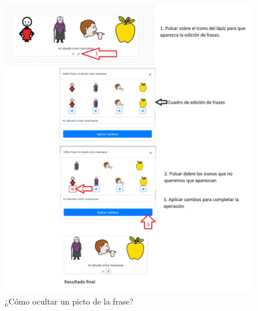 \begin{figure}[h!]
	\centering
	\includegraphics[width=\linewidth]{Imagenes/Bitmap/Tarea3-Pista4}
	\caption{¿Cómo ocultar un picto de la frase?}
	\label{fig:tarea3-pista4}
\end{figure}


